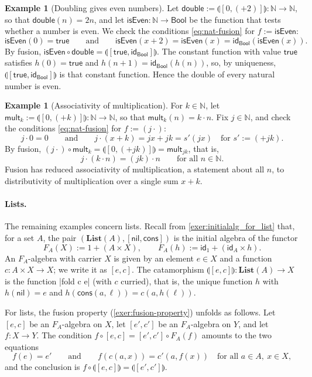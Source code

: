 \documentclass[a4paper,11pt, oneside,titlepage=false]{scrbook}
\theoremstyle{plain}
\theoremstyle{definition}
\newtheorem{exa}[thm]{Example}
\newcommand{\cfont}[1]{\ensuremath{\mathsf{#1}}}
\newcommand{\Catb}[1]{\mathbf{#1}}
\newcommand{\List}{\Catb{List}}
\newcommand{\Id}[1][]{\cfont{id}_{#1}}
\newcommand{\catam}[1]{\llparenthesis #1 \rrparenthesis}
\newcommand{\nil}{\ensuremath{\mathsf{nil}}}
\newcommand{\cons}{\ensuremath{\mathsf{cons}}}
\newcommand{\co}[2]{\ensuremath{#2 \circ #1}}
\newcommand{\NN}{\ensuremath{\mathbb{N}}}
\newcommand{\Bool}{\ensuremath{\mathsf{Bool}}}
\begin{document}
\begin{exa}[Doubling gives even numbers]\label{exa:fusion-double-even}
  Let $\mathsf{double} := \catam{[0, (+2)]} : \NN \to \NN$, so that $\mathsf{double}(n) = 2n$, and let $\mathsf{isEven} : \NN \to \Bool$ be the function that tests whether a number is even.
  We check the conditions \eqref{eq:nat-fusion} for $f := \mathsf{isEven}$:
  \[ \mathsf{isEven}(0) = \mathsf{true} \qquad\text{and}\qquad \mathsf{isEven}(x + 2) = \mathsf{isEven}(x) = \Id[\Bool](\mathsf{isEven}(x)). \]
  By fusion, $\mathsf{isEven} \circ \mathsf{double} = \catam{[\mathsf{true}, \Id[\Bool]]}$.
  The constant function with value $\mathsf{true}$ satisfies $h(0) = \mathsf{true}$ and $h(n+1) = \Id[\Bool](h(n))$, so, by uniqueness, $\catam{[\mathsf{true}, \Id[\Bool]]}$ is that constant function.
  Hence the double of every natural number is even.
\end{exa}

\begin{exa}[Associativity of multiplication]\label{exa:fusion-mult-assoc}
  For $k \in \NN$, let $\mathsf{mult}_k := \catam{[0, (+k)]} : \NN \to \NN$, so that $\mathsf{mult}_k(n) = k \cdot n$.
  Fix $j \in \NN$, and check the conditions \eqref{eq:nat-fusion} for $f := (j\cdot)$:
  \[ j \cdot 0 = 0 \qquad\text{and}\qquad j \cdot (x + k) = j x + j k = s'(j x) \quad\text{for } s' := (+ jk). \]
  By fusion, $(j\cdot) \circ \mathsf{mult}_k = \catam{[0, (+jk)]} = \mathsf{mult}_{jk}$, that is,
  \[ j \cdot (k \cdot n) = (j k) \cdot n \qquad\text{for all } n \in \NN. \]
  Fusion has reduced associativity of multiplication, a statement about all $n$, to distributivity of multiplication over a single sum $x + k$.
\end{exa}

\paragraph{Lists.}
The remaining examples concern lists.
Recall from \cref{exer:initialalg_for_list} that, for a set $A$, the pair $(\List(A), [\nil, \cons])$ is the initial algebra of the functor
\[ F_A(X) := 1 + (A \times X), \qquad F_A(h) := \Id[1] + (\Id[A] \times h). \]
An $F_A$-algebra with carrier $X$ is given by an element $e \in X$ and a function $c : A \times X \to X$; we write it as $[e, c]$.
The catamorphism $\catam{[e,c]} : \List(A) \to X$ is the function |fold c e| (with $c$ curried), that is, the unique function $h$ with
$h(\nil) = e$ and $h(\cons(a, \ell)) = c(a, h(\ell))$.

For lists, the fusion property (\cref{exer:fusion-property}) unfolds as follows.
Let $[e, c]$ be an $F_A$-algebra on $X$, let $[e', c']$ be an $F_A$-algebra on $Y$, and let $f : X \to Y$.
The condition $\co{[e,c]}{f} = \co{F_A(f)}{[e',c']}$ amounts to the two equations
\begin{equation}\label{eq:list-fusion}
  f(e) = e'
  \qquad\text{and}\qquad
  f(c(a, x)) = c'(a, f(x)) \quad \text{for all } a \in A,\ x \in X,
\end{equation}
and the conclusion is $f \circ \catam{[e,c]} = \catam{[e', c']}$.
\end{document}

